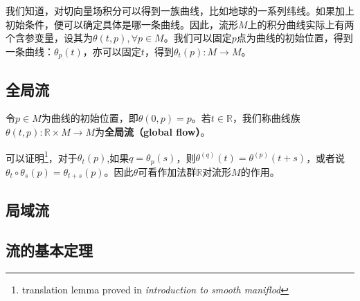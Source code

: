 我们知道，对切向量场积分可以得到一族曲线，比如地球的一系列纬线。如果加上初始条件，便可以确定具体是哪一条曲线。因此，流形$M$上的积分曲线实际上有两个含参变量，设其为$\theta(t,p),\forall p\in M$。我们可以固定$p$点为曲线的初始位置，得到一条曲线：$\theta_p(t)$，亦可以固定$t$，得到$\theta_t(p):M\rightarrow M$。
\subsection{全局流}
令$p\in M$为曲线的初始位置，即$\theta(0,p)=p$。若$t\in\mathbb R$，我们称曲线族$\theta(t,p):\mathbb R\times M\rightarrow M$为\textbf{全局流（global flow）}。

可以证明\footnote{translation lemma proved in \textsl{introduction to smooth maniflod}}，对于$\theta_t(p)$,如果$q=\theta_p(s)$，则$\theta^{(q)}(t)=\theta^{(p)}(t+s)$，或者说$\theta_t \circ \theta_s(p)=\theta_{t+s}(p)$。因此$\theta$可看作加法群$\mathbb R$对流形$M$的作用。
\subsection{局域流}
\subsection{流的基本定理}
